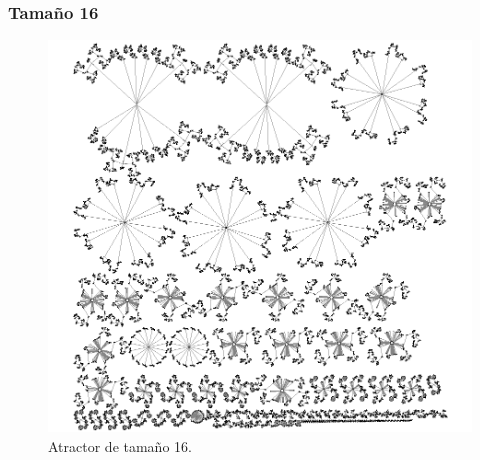 \documentclass[11pt]{article}
\begin{document}
			\subsubsection{Tamaño 16}
			\begin{figure}[H]
			\centering
			\includegraphics[scale=0.8]{resources/Atractores54/atractor_54_size_16.png}
			\caption{Atractor de tamaño 16.}\label{fig:picture}
			\end{figure}
\end{document}
